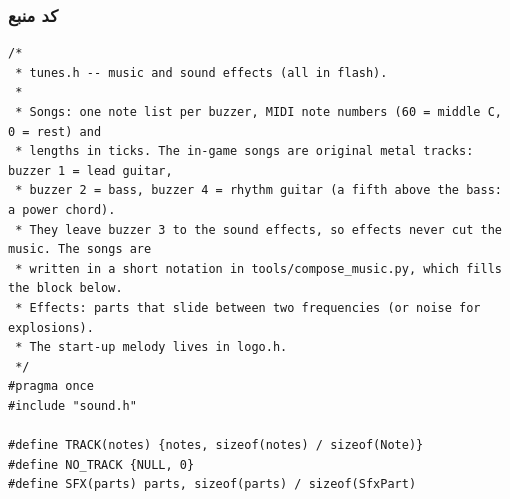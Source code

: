 \documentclass[11pt,a4paper]{article}
\begin{document}
\subsubsection*{کد منبع}
\begin{latin}
\begin{lstlisting}[language=Arduino]
/*
 * tunes.h -- music and sound effects (all in flash).
 *
 * Songs: one note list per buzzer, MIDI note numbers (60 = middle C, 0 = rest) and
 * lengths in ticks. The in-game songs are original metal tracks: buzzer 1 = lead guitar,
 * buzzer 2 = bass, buzzer 4 = rhythm guitar (a fifth above the bass: a power chord).
 * They leave buzzer 3 to the sound effects, so effects never cut the music. The songs are
 * written in a short notation in tools/compose_music.py, which fills the block below.
 * Effects: parts that slide between two frequencies (or noise for explosions).
 * The start-up melody lives in logo.h.
 */
#pragma once
#include "sound.h"

#define TRACK(notes) {notes, sizeof(notes) / sizeof(Note)}
#define NO_TRACK {NULL, 0}
#define SFX(parts) parts, sizeof(parts) / sizeof(SfxPart)


\end{lstlisting}
\end{latin}
\end{document}
